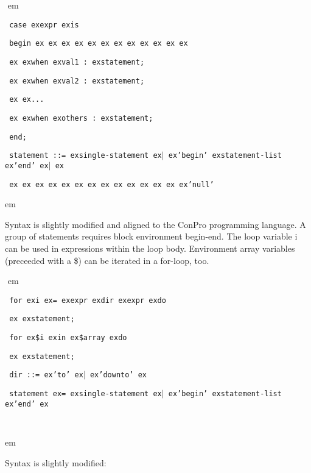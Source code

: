 \documentclass[a4paper,12pt,twoside,english]{article}
\def\s{\hskip 1.15 ex}
\begin{document}
\begin{description}
\begin{description}
\def\prefskipu{}\def\prefskipo{}\def\prefskipa{}\def\prefskipu{\hskip10pt}\def\prefskipo{\hskip10pt}\def\prefskipa{\hskip30pt}\def\content{
\vskip-5pt{\parindent0pt\parbox{\linewidth}{\tt\smallsize\hskip10pt case\s expr\s is}}
\vskip-5pt{\parindent0pt\parbox{\linewidth}{\tt\smallsize\hskip10pt begin\s \s \s \s \s \s \s \s \s \s \s \s }}
\vskip-5pt{\parindent0pt\parbox{\linewidth}{\tt\smallsize\hskip10pt \s \s when\s val1~:\s statement;}}
\vskip-5pt{\parindent0pt\parbox{\linewidth}{\tt\smallsize\hskip10pt \s \s when\s val2~:\s statement;}}
\vskip-5pt{\parindent0pt\parbox{\linewidth}{\tt\smallsize\hskip10pt \s \s ...}}
\vskip-5pt{\parindent0pt\parbox{\linewidth}{\tt\smallsize\hskip10pt \s \s when\s others~:\s statement;}}
\vskip-5pt{\parindent0pt\parbox{\linewidth}{\tt\smallsize\hskip10pt end;}}
\vskip-5pt{\parindent0pt\parbox{\linewidth}{\tt\smallsize\hskip10pt statement~::=\s single-statement\s $|$\s 'begin'\s statement-list\s 'end'\s $|$\s }}
\vskip-5pt{\parindent0pt\parbox{\linewidth}{\tt\smallsize\hskip10pt \s \s \s \s \s \s \s \s \s \s \s \s \s \s 'null'}}
}
$ $
 em
\content
{} em
\item[\colorit{\bf for}] $ $\\
Syntax is slightly modified and aligned to the ConPro programming language. A group of statements requires block environment begin-end.  The loop variable i can
be used in expressions within the loop body. Environment array variables  (preceeded with a \$) can be iterated in a for-loop, too.

\def\prefskipu{}\def\prefskipo{}\def\prefskipa{}\def\prefskipu{\hskip10pt}\def\prefskipo{\hskip10pt}\def\prefskipa{\hskip30pt}\def\content{
\vskip-5pt{\parindent0pt\parbox{\linewidth}{\tt\smallsize\hskip10pt for\s i\s =\s expr\s dir\s expr\s do}}
\vskip-5pt{\parindent0pt\parbox{\linewidth}{\tt\smallsize\hskip10pt \s \s statement;}}
\vskip-5pt{\parindent0pt\parbox{\linewidth}{\tt\smallsize\hskip10pt for\s \$i\s in\s \$array\s do}}
\vskip-5pt{\parindent0pt\parbox{\linewidth}{\tt\smallsize\hskip10pt \s \s statement;}}
\vskip-5pt{\parindent0pt\parbox{\linewidth}{\tt\smallsize\hskip10pt dir~::=\s 'to'\s $|$\s 'downto'\s }}
\vskip-5pt{\parindent0pt\parbox{\linewidth}{\tt\smallsize\hskip10pt statement\s =\s single-statement\s $|$\s 'begin'\s statement-list\s 'end'\s }}
\vskip-5pt{\parindent0pt\parbox{\linewidth}{\tt\smallsize\hskip10pt }}
}
$ $
 em
\content
{} em
\item[\colorit{\bf constant values}] $ $\\
Syntax  is slightly modified:  


\end{description}
\end{description}
\end{document}
